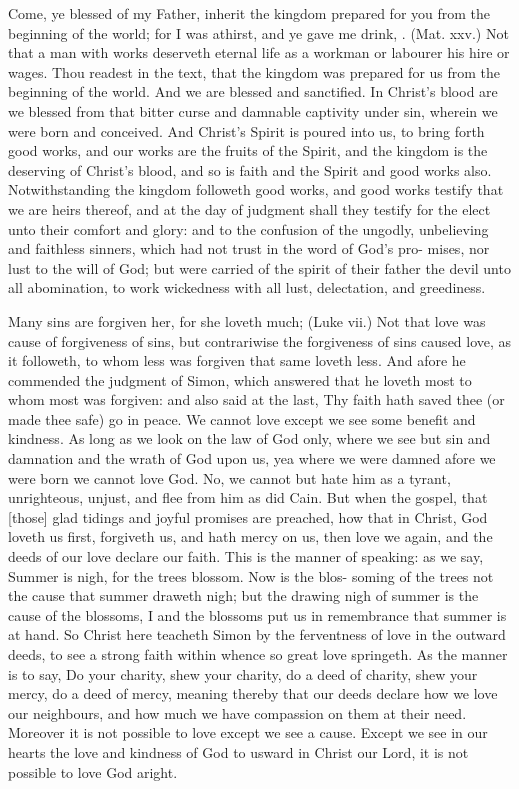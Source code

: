 \documentclass{article}
\begin{document}
Come, ye blessed of my Father, inherit the kingdom 
prepared for you from the beginning of the world; for I 
was athirst, and ye gave me drink, \ampc. (Mat. xxv.) Not
that a man with works deserveth eternal life as a workman 
or labourer his hire or wages. Thou readest in the text, 
that the kingdom was prepared for us from the beginning of 
the world. And we are blessed and sanctified. In Christ's 
blood are we blessed from that bitter curse and damnable 
captivity under sin, wherein we were born and conceived. 
And Christ's Spirit is poured into us, to bring forth good 
works, and our works are the fruits of the Spirit, and the 
kingdom is the deserving of Christ's blood, and so is faith 
and the Spirit and good works also. Notwithstanding the 
kingdom followeth good works, and good works testify that 
we are heirs thereof, and at the day of judgment shall they 
testify for the elect unto their comfort and glory: and to 
the confusion of the ungodly, unbelieving and faithless 
sinners, which had not trust in the word of God's pro- 
mises, nor lust to the will of God; but were carried of 
the spirit of their father the devil unto all abomination, to 
work wickedness with all lust, delectation, and greediness. 

Many sins are forgiven her, for she loveth much; 
(Luke vii.) Not that love was cause of forgiveness of sins,
but contrariwise the forgiveness of sins caused love, as it 
followeth, to whom less was forgiven that same loveth less. 
And afore he commended the judgment of Simon, which 
answered that he loveth most to whom most was forgiven: 
and also said at the last, Thy faith hath saved thee (or 
made thee safe) go in peace. We cannot love except we 
see some benefit and kindness. As long as we look on
the law of God only, where we see but sin and damnation
and the wrath of God upon us, yea where we were damned 
afore we were born we cannot love God. No, we cannot 
but hate him as a tyrant, unrighteous, unjust, and 
flee from him as did Cain. But when the gospel, that [those] 
glad tidings and joyful promises are preached, how that in 
Christ, God loveth us first, forgiveth us, and hath mercy on 
us, then love we again, and the deeds of our love declare 
our faith. This is the manner of speaking: as we say, 
Summer is nigh, for the trees blossom. Now is the blos- 
soming of the trees not the cause that summer draweth 
nigh; but the drawing nigh of summer is the cause of 
the blossoms, I and the blossoms put us in remembrance 
that summer is at hand. So Christ here teacheth Simon 
by the ferventness of love in the outward deeds, to see a 
strong faith within whence so great love springeth. As 
the manner is to say, Do your charity, shew your charity, 
do a deed of charity, shew your mercy, do a deed of mercy, 
meaning thereby that our deeds declare how we love our 
neighbours, and how much we have compassion on them 
at their need. Moreover it is not possible to love except 
we see a cause. Except we see in our hearts the love and 
kindness of God to usward in Christ our Lord, it is not 
possible to love God aright. 
\end{document}
